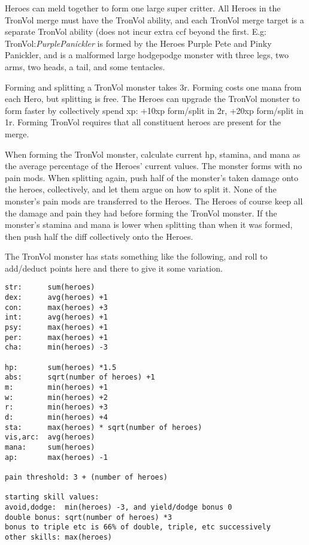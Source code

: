 

 Heroes can meld together to form one large super critter. All Heroes in the TronVol merge must have the TronVol ability, and each TronVol merge target is a separate TronVol ability (does not incur extra ccf beyond the first.
E.g: TronVol:\emph{PurplePanickler} is formed by the Heroes Purple Pete and Pinky Panickler, and is a malformed large hodgepodge monster with three legs, two arms, two heads, a tail, and some tentacles.

Forming and splitting a TronVol monster takes 3r. Forming costs one mana from each Hero, but splitting is free. The Heroes can upgrade the TronVol monster to form faster by collectively spend xp: +10xp form/split in 2r, +20xp form/split in 1r.
Forming TronVol requires that all constituent heroes are present for the merge.

When forming the TronVol monster, calculate current hp, stamina, and mana as the average percentage of the Heroes' current values. The monster forms with no pain mods. When splitting again, push half of the monster's taken damage onto the heroes, collectively, and let them argue on how to split it. None of the monster's pain mods are transferred to the Heroes. The Heroes of course keep all the damage and pain they had before forming the TronVol monster. If the monster's stamina and mana is lower when splitting than when it was formed, then push half the diff collectively onto the Heroes.

The TronVol monster has stats something like the following, and roll to add/deduct points here and there to give it some variation.
\small\begin{verbatim}
str:      sum(heroes)
dex:      avg(heroes) +1
con:      max(heroes) +3
int:      avg(heroes) +1
psy:      max(heroes) +1
per:      max(heroes) +1
cha:      min(heroes) -3

hp:       sum(heroes) *1.5
abs:      sqrt(number of heroes) +1
m:        min(heroes) +1
w:        min(heroes) +2
r:        min(heroes) +3
d:        min(heroes) +4
sta:      max(heroes) * sqrt(number of heroes)
vis,arc:  avg(heroes)
mana:     sum(heroes)
ap:       max(heroes) -1

pain threshold: 3 + (number of heroes)

starting skill values:
avoid,dodge:  min(heroes) -3, and yield/dodge bonus 0
double bonus: sqrt(number of heroes) *3
bonus to triple etc is 66% of double, triple, etc successively
other skills: max(heroes)
\end{verbatim}\normalsize

